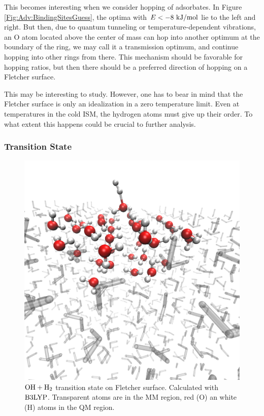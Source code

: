 
This becomes interesting when we consider hopping of adsorbates. In
Figure \ref{Fig:Adv:BindingSitesGuess}, the optima with $E<-8~\text {kJ/mol}$ lie to the
left and right. But then, due to quantum tunneling or temperature-dependent
vibrations, an O atom located above the center of mass can hop into another
optimum at the boundary of the ring, we may call it a transmission optimum, and
continue hopping into other rings from there. This mechanism should be
favorable for hopping ratios, but then there should be a preferred direction
of hopping on a Fletcher surface.

This may be interesting to study. However, one has to bear in mind that the
Fletcher surface is only an idealization in a zero temperature limit. Even at
temperatures in the cold ISM, the hydrogen atoms must give up their order. To
what extent this happens could be crucial to further analysis.


\subsubsection{Transition State}
\label{Sec:Adv:Trans}
\newcommand\hoht{\mbox{\enmat{\ho+\htw}}}

\begin{figure}[t!]
\centering
\includegraphics[width=.7\textwidth]{./img/FletcherAdsorption.png}
\caption{$\hoht$ transition state on Fletcher surface. Calculated with $\text{B3LYP}$.
Transparent atoms are in the MM region, red (O) an white (H) atoms in the QM
region.}
\label{Fig:Adv:TS}
\end{figure}


